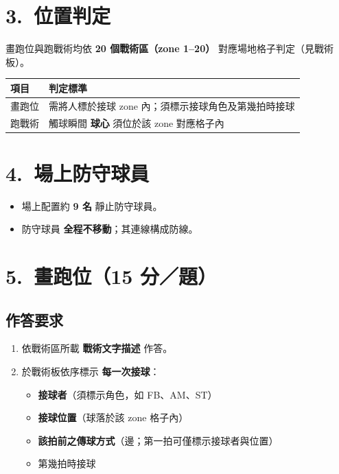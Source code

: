 \documentclass[11pt]{article}
\newcommand{\term}[1]{\textbf{#1}}
\begin{document}
\section*{3.\ 位置判定}

畫跑位與跑戰術均依 \term{20 個戰術區（zone 1--20）} 對應場地格子判定（見戰術板）。

\vspace{0.4em}
\begin{tabular}{@{}ll@{}}
\toprule
\textbf{項目} & \textbf{判定標準} \\
\midrule
畫跑位 & 需將人標於接球 zone 內；須標示接球角色及第幾拍時接球 \\
跑戰術 & 觸球瞬間 \term{球心} 須位於該 zone 對應格子內 \\
\bottomrule
\end{tabular}

\section*{4.\ 場上防守球員}

\begin{itemize}
  \item 場上配置約 \term{9 名} 靜止防守球員。
  \item 防守球員 \term{全程不移動}；其連線構成防線。
\end{itemize}

\section*{5.\ 畫跑位（15 分／題）}

\subsection*{作答要求}

\begin{enumerate}
  \item 依戰術區所載 \term{戰術文字描述} 作答。
  \item 於戰術板依序標示 \term{每一次接球}：
  \begin{itemize}
    \item \textbf{接球者}（須標示角色，如 FB、AM、ST）
    \item \textbf{接球位置}（球落於該 zone 格子內）
    \item \textbf{該拍前之傳球方式}（邊；第一拍可僅標示接球者與位置）
    \item 第幾拍時接球
  \end{itemize}
\end{enumerate}
\end{document}
